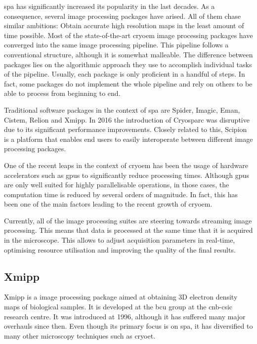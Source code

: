\documentclass[../main.tex]{subfiles}
\begin{document}
\Gls{spa} has significantly increased its popularity in the last decades. As a consequence, several image processing packages have arised. All of them chase similar ambitions: Obtain accurate high resolution maps in the least amount of time possible. Most of the state-of-the-art \gls{cryoem} image processing packages have converged into the same image processing pipeline. This pipeline follows a conventional structure, although it is somewhat malleable. The difference between packages lies on the algorithmic approach they use to accomplish individual tasks of the pipeline. Usually, each package is only proficient in a handful of steps. In fact, some packages do not implement the whole pipeline and rely on others to be able to process from beginning to end.

Traditional software packages in the context of \gls{spa} are Spider\cite{shaikh2008}, Imagic, Eman\cite{ludke2000}, Cistem\cite{grigorieff2018}, Relion\cite{scheres2021} and Xmipp\cite{sorzano2004}. In 2016 the introduction of Cryosparc\cite{cryosparc} was disruptive due to its significant performance improvements. Closely related to this, Scipion\cite{delarosa2016} is a platform that enables end users to easily interoperate between different image processing packages.

One of the recent leaps in the context of \gls{cryoem} has been the usage of hardware accelerators such as \glspl{gpu} to significantly reduce processing times. Although \glspl{gpu} are only well suited for highly parallelisable operations, in those cases, the computation time is reduced by several orders of magnitude. In fact, this has been one of the main factors leading to the recent growth of \gls{cryoem}.

Currently, all of the image processing suites are steering towards streaming image processing. This means that data is processed at the same time that it is acquired in the microscope. This allows to adjust acquisition parameters in real-time, optimising resource utilisation and improving the quality of the final results.

\subsection{Xmipp}
Xmipp is a image processing package aimed at obtaining 3D electron density maps of biological samples. It is developed at the \gls{bcu} group at the \gls{cnb}-\gls{csic} research centre. It was introduced at 1996, although it has suffered many major overhauls since then. Even though its primary focus is on \gls{spa}, it has diversified to many other microscopy techniques such as \gls{cryoet}\cite{sorzano2004}.
\end{document}
